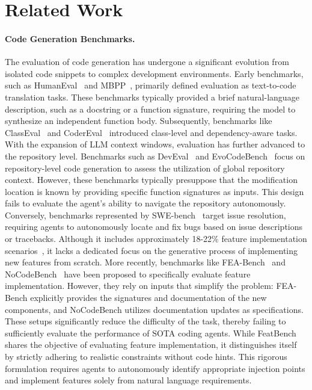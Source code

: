 \section{Related Work}
\paragraph{\textbf{Code Generation Benchmarks.}} The evaluation of code generation has undergone a significant evolution from isolated code snippets to complex development environments. Early benchmarks, such as HumanEval~\cite{humaneval} and MBPP~\cite{austin2021program}, primarily defined evaluation as text-to-code translation tasks. These benchmarks typically provided a brief natural-language description, such as a docstring or a function signature, requiring the model to synthesize an independent function body. Subsequently, benchmarks like ClassEval~\cite{classeval} and CoderEval~\cite{yu2024codereval} introduced class-level and dependency-aware tasks. With the expansion of LLM context windows, evaluation has further advanced to the repository level. Benchmarks such as DevEval~\cite{li2024deveval} and EvoCodeBench~\cite{li2024evocodebench} focus on repository-level code generation to assess the utilization of global repository context. However, these benchmarks typically presuppose that the modification location is known by providing specific function signatures as inputs. This design fails to evaluate the agent's ability to navigate the repository autonomously. Conversely, benchmarks represented by SWE-bench~\cite{swebench} target issue resolution, requiring agents to autonomously locate and fix bugs based on issue descriptions or tracebacks. Although it includes approximately 18-22\% feature implementation scenarios~\cite{rashid2025swe}, it lacks a dedicated focus on the generative process of implementing new features from scratch. More recently, benchmarks like FEA-Bench~\cite{li2025fea} and NoCodeBench~\cite{deng2025nocode} have been proposed to specifically evaluate feature implementation. However, they rely on inputs that simplify the problem: FEA-Bench explicitly provides the signatures and documentation of the new components, and NoCodeBench utilizes documentation updates as specifications. These setups significantly reduce the difficulty of the task, thereby failing to sufficiently evaluate the performance of SOTA coding agents. While FeatBench shares the objective of evaluating feature implementation, it distinguishes itself by strictly adhering to realistic constraints without code hints. This rigorous formulation requires agents to autonomously identify appropriate injection points and implement features solely from natural language requirements.

